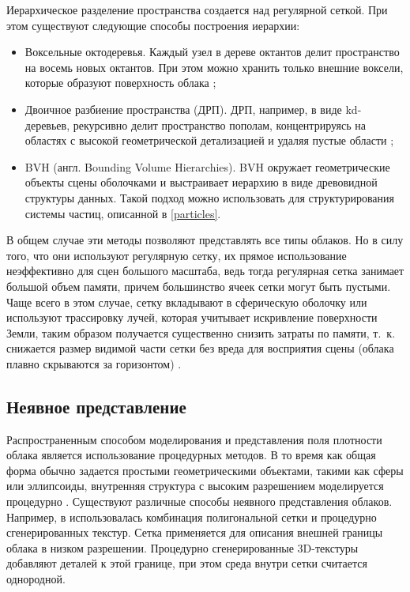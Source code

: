 Иерархическое разделение пространства создается над регулярной сеткой. При этом существуют следующие способы построения иерархии:
\begin{itemize}
	\item Воксельные октодеревья. Каждый узел в дереве октантов делит пространство на восемь новых октантов. При этом можно хранить только внешние воксели, которые образуют поверхность облака \cite{clouds};
	\item Двоичное разбиение пространства (ДРП). ДРП, например, в виде kd-деревьев, рекурсивно делит пространство пополам, концентрируясь на областях с высокой геометрической детализацией и удаляя пустые области \cite{clouds};
	\item BVH (англ. Bounding Volume Hierarchies). BVH окружает геометрические объекты сцены оболочками и выстраивает иерархию в виде древовидной структуры данных. Такой подход можно использовать для структурирования системы частиц, описанной в \ref{particles}.
\end{itemize}

 В общем случае эти методы позволяют представлять все типы облаков. Но в силу того, что они используют регулярную сетку, их прямое использование неэффективно для сцен большого масштаба, ведь тогда регулярная сетка занимает большой объем памяти, причем большинство ячеек сетки могут быть пустыми. Чаще всего в этом случае, сетку вкладывают в сферическую оболочку или используют трассировку лучей, которая учитывает искривление поверхности Земли, таким образом получается существенно снизить затраты по памяти, т.~к. снижается размер видимой части сетки без вреда для восприятия сцены (облака плавно скрываются за горизонтом) \cite{clouds}.


\subsection{Неявное представление} 
\label{implicit}
Распространенным способом моделирования и представления поля плотности облака является использование процедурных методов. В то время как общая форма обычно задается простыми геометрическими объектами, такими как сферы или эллипсоиды, внутренняя структура с высоким разрешением моделируется процедурно \cite{clouds}. Существуют различные способы неявного представления облаков. Например, в \cite{implicit} использовалась комбинация полигональной сетки и процедурно сгенерированных текстур. Сетка применяется для описания внешней границы облака в низком разрешении. Процедурно сгенерированные 3D-текстуры добавляют деталей к этой границе, при этом среда внутри сетки считается однородной.

